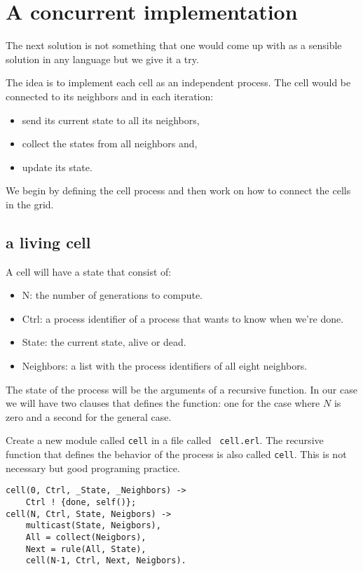 \documentclass[a4paper,11pt]{article}
\begin{document}
\section{A concurrent implementation}

The next solution is not something that one would come up with as a
sensible solution in any language but we give it a try.

The idea is to implement each cell as an independent process. The cell
would be connected to its neighbors and in each iteration:

\begin{itemize}
\item send its current state to all its neighbors,
\item collect the states from all neighbors and,
\item update its state.
\end{itemize}

We begin by defining the cell process and then work on how to connect
the cells in the grid.

\subsection{a living cell}

A cell will have a state that consist of:

\begin{itemize}
\item N: the number of generations to compute.
\item Ctrl: a process identifier of a process that wants to know when we're done.
\item State: the current state, alive or dead.
\item Neighbors: a list with the process identifiers of all eight neighbors. 
\end{itemize}

The state of the process will be the arguments of a recursive
function. In our case we will have two clauses that defines the
function: one for the case where $N$ is zero and a second for the
general case.

Create a new module called {\tt cell} in a file called {\tt
  cell.erl}. The recursive function that defines the behavior of the
process is also called {\tt cell}. This is not necessary but good
programing practice.


\begin{verbatim}
cell(0, Ctrl, _State, _Neighbors) ->
    Ctrl ! {done, self()};
cell(N, Ctrl, State, Neigbors) ->    
    multicast(State, Neigbors),
    All = collect(Neigbors),
    Next = rule(All, State),
    cell(N-1, Ctrl, Next, Neigbors).
\end{verbatim}    
\end{document}
